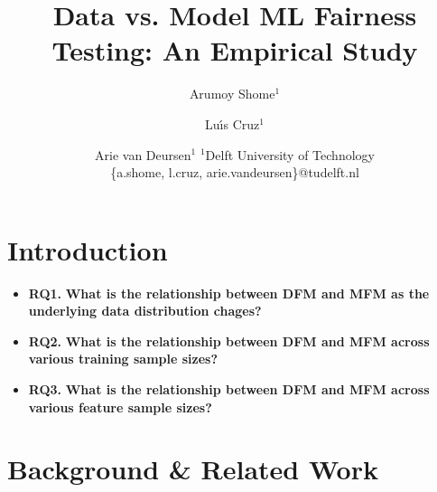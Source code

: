 \documentclass{article}
\title{Data vs. Model ML Fairness Testing: An Empirical Study}
\author{
  Arumoy Shome$^1$
  \and
  Lu{\'\i}s Cruz$^1$\and
  Arie van Deursen$^{1}$
  \affiliations
  $^1$Delft University of Technology\\
  \emails
  \{a.shome, l.cruz, arie.vandeursen\}@tudelft.nl
}
\begin{document}
\maketitle

\begin{abstract}
\end{abstract}

\section{Introduction}\label{sec:intro}





\begin{itemize}
\item{\textbf{RQ1.}} \textbf{What is the relationship between DFM
  and MFM as the underlying data distribution chages?}
\item{\textbf{RQ2.}} \textbf{What is the relationship between DFM and
  MFM across various training sample sizes?}
\item{\textbf{RQ3.}} \textbf{What is the relationship between DFM and
  MFM across various feature sample sizes?}
\end{itemize}

\section{Background \& Related Work}\label{sec:related}

\end{document}
